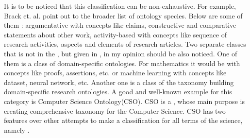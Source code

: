 		It is to be noticed that this classification can be non-exhaustive. For example, Brack et. al. point out to the broader list of ontology species. Below are some of them\cite{Bra20} : argumentative with concepts like claims, constructive and comparative statements about other work, activity-based with concepts like sequence of research activities, aspects and elements of research articles. Two separate classes that is not in the \cite{Cor14}, but given in \cite{Bra20}, in my opinion should be also noticed. One of them is a class of domain-specific ontologies. For mathematics it would be with concepts like proofs, assertions, etc. or machine learning with concepts like dataset, neural network, etc. Another one is a class of the taxonomy building domain-specific research ontologies. A good and well-known example for this category is Computer Science Ontology(CSO). CSO is a \frqq\cite[p.1]{CSO19}, whose main purpose is creating comprehensive taxonomy for the Computer Science. CSO has two features over other attempts to make a classification for all terms of the science, namely \frqq\cite[p.1]{CSO19}.  
		

